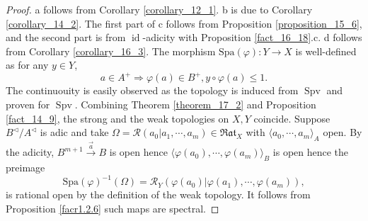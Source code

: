 \documentclass[8pt]{article}
\numberwithin{equation}{section}
\DeclareMathOperator{\id}{id}
\DeclareMathOperator{\Spv}{Spv}
\newcommand{\cR}[0]{\mathcal{R}}
\newcommand{\Rat}[0]{\mathfrak{Rat}}
\begin{document}
\begin{proof}
    a follows from Corollary \ref{corollary_12_1}. b is due to Corollary \ref{corollary_14_2}. 
    The first part of c follows from Proposition \ref{proposition_15_6}, and the second part is from $\id$-adicity with Proposition \ref{fact_16_18}.c. 
    d follows from Corollary \ref{corollary_16_3}. 
    The morphism $\mathrm{Spa}(\varphi):Y\to X$ is well-defined as for any $y\in Y$,
    \begin{equation*}
        a\in A^+\Rightarrow \varphi(a)\in B^+, y\circ\varphi(a)\leq 1.
    \end{equation*}
    The continuouity is easily observed as the topology is induced from $\Spv$ and proven for $\Spv$. 
    Combining Theorem \ref{theorem_17_2} and Proposition \ref{fact_14_9}, the strong and the weak topologies on $X,Y$ coincide. 
    Suppose $B^{\triangleleft}/A^{\triangleleft}$ is adic and take $\Omega=\cR(a_0|a_1,\cdots,a_m)\in\Rat_X$ with $\langle a_0,\cdots,a_m\rangle_A$ open. 
    By the adicity, $B^{m+1}\stackrel{\vec{a}}{\to}B$ is open hence $\langle \varphi(a_0),\cdots,\varphi(a_m)\rangle_B$ is open hence the preimage 
    \begin{equation*}
        \mathrm{Spa}(\varphi)^{-1}(\Omega) = \cR_Y(\varphi(a_0)|\varphi(a_1),\cdots,\varphi(a_m)),
    \end{equation*}
    is rational open by the definition of the weak topology. It follows from Proposition \ref{facr1.2.6} such maps are spectral.
\end{proof}
\end{document}
